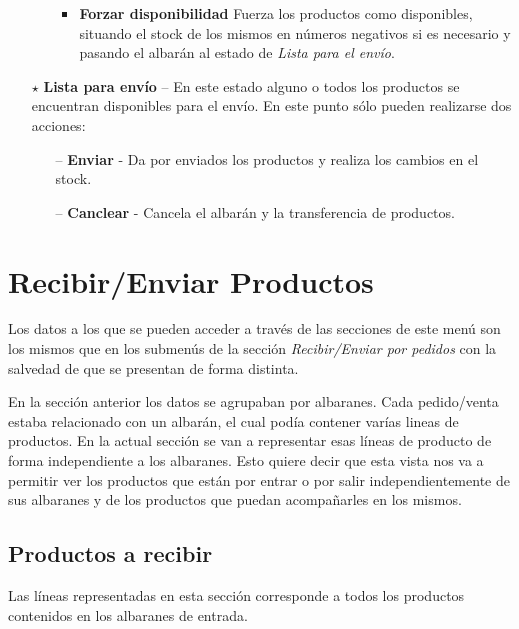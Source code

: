 \begin{itemize}
\begin{itemize}
\begin{itemize}
      \item \textbf{Forzar disponibilidad} Fuerza los productos como disponibles, situando el stock de los mismos en números negativos si es necesario y pasando el albarán al estado de \emph{Lista para el envío}.
      \end{itemize}
    \end{itemize}




  \item[$\star$] \textbf{Lista para envío} -- En este estado alguno o todos los productos se encuentran disponibles para el envío. En este punto sólo pueden realizarse dos acciones:

    \begin{itemize}
    \item[--] \textbf{Enviar} - Da por enviados los productos y realiza los cambios en el stock.
    \item[--] \textbf{Canclear} - Cancela el albarán y la transferencia de productos.
    \end{itemize}
\end{itemize}






\vspace{0.5cm}
\section{Recibir/Enviar Productos}
Los datos a los que se pueden acceder a través de las secciones de este menú son los mismos que en los submenús de la sección \emph{Recibir/Enviar por pedidos} con la salvedad de que se presentan de forma distinta.

En la sección anterior los datos se agrupaban por albaranes. Cada pedido/venta estaba relacionado con un albarán, el cual podía contener varías lineas de productos. En la actual sección se van a representar esas líneas de producto de forma independiente a los albaranes. Esto quiere decir que esta vista nos va a permitir ver los productos que están por entrar o por salir independientemente de sus albaranes y de los productos que puedan acompañarles en los mismos.

\subsection{Productos a recibir}
Las líneas representadas en esta sección corresponde a todos los productos contenidos en los albaranes de entrada.

